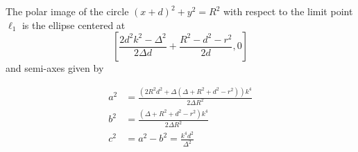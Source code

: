  
 \begin{lemma} The polar image of the circle $(x+d)^2+y^2=R^2$ with respect to the limit point $  \ell_1 $ is the ellipse centered at
 \[ \left[ \frac{ 2 d^2 k^2 - \Delta^2}{ 2 \Delta d} + \frac{R^2 - d^2 - r^2}{ 2 d},0\right] \]
 and semi-axes given by
 
 \begin{align*}
     a^2&= \frac{(2R^2d^2 + \Delta (  \Delta+R^2 + d^2 - r^2 ))k^4}{ 2 \Delta R^2}  \\
     b^2&=  \frac{(\Delta+R^2 + d^2 - r^2   )k^4}{ 2 \Delta R^2} \\
     c^2&=a^2-b^2=\frac{k^4d^2}{\Delta^2}
 \end{align*}
 \end{lemma}

 